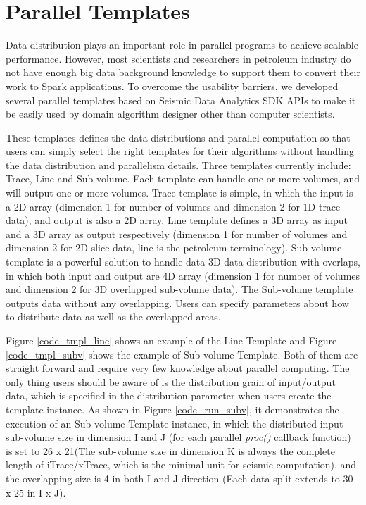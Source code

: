 \section{Parallel Templates}

Data distribution plays an important role in parallel programs to achieve scalable performance. However, most scientists and researchers in petroleum industry do not have enough big data background knowledge to support them to convert their work to Spark applications. To overcome the usability barriers, we developed several parallel templates based on Seismic Data Analytics SDK APIs to make it be easily used by domain algorithm designer other than computer scientists.

These templates defines the data distributions and parallel computation so that users can simply select the right templates for their algorithms without handling the data distribution and parallelism details. Three templates currently include: Trace, Line and Sub-volume. Each template can handle one or more volumes, and will output one or more volumes. Trace template is simple, in which the input is a 2D array (dimension 1 for number of volumes and dimension 2 for 1D trace data), and output is also a 2D array. Line template defines a 3D array as input and a 3D array as output respectively (dimension 1 for number of volumes and dimension 2 for 2D slice data, line is the petroleum terminology). Sub-volume template is a powerful solution to handle data 3D data distribution with overlaps, in which both input and output are 4D array (dimension 1 for number of volumes and dimension 2 for 3D overlapped sub-volume data). The Sub-volume template outputs data without any overlapping. Users can specify parameters about how to distribute data as well as the overlapped areas. 

Figure \ref{code_tmpl_line} shows an example of the Line Template and Figure \ref{code_tmpl_subv} shows the example of Sub-volume Template. Both of them are straight forward and require very few knowledge about parallel computing. The only thing users should be aware of is the distribution grain of input/output data, which is specified in the distribution parameter when users create the template instance. As shown in Figure \ref{code_run_subv}, it demonstrates the execution of an Sub-volume Template instance, in which the distributed input sub-volume size in dimension I and J (for each parallel \emph{proc()} callback function) is set to 26 x 21(The sub-volume size in dimension K is always the complete length of iTrace/xTrace, which is the minimal unit for seismic computation), and the overlapping size is 4 in both I and J direction (Each data split extends to 30 x 25 in I x J).

